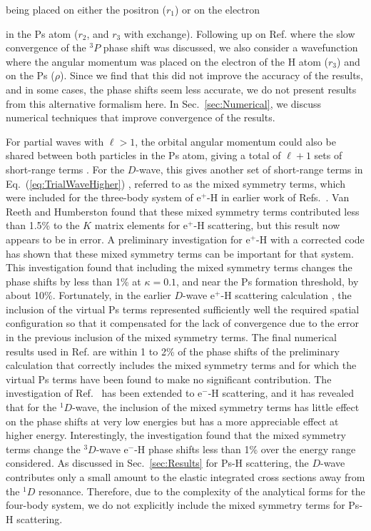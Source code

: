 \documentclass[preprint,showpacs,showkeys,preprintnumbers,amsmath,amssymb,longbibliography,pra,aps]{revtex4-1}
\begin{document}
being placed on either the positron ($r_1$) or on the electron {in the Ps
atom ($r_2$, and $r_3$
with exchange). Following up on Ref. \cite{VanReeth2004} where the slow 
convergence of the $^3P$ phase shift was discussed, we also consider a 
wavefunction where the angular momentum was placed on the electron of the H 
atom ($r_3$) and on the Ps ($\rho$). Since we find that this did not improve the
accuracy of the results, and in some cases, the phase shifts seem less
accurate, we do not present results from this alternative
formalism here.
In Sec.~\ref{sec:Numerical}, we discuss numerical techniques that improve
convergence of the results.

For partial waves with $\ell>1$, the orbital angular momentum could also be 
shared between both particles in the Ps atom, giving a total of
$\ell + 1$ sets of short-range terms \cite{Schwartz1961a}. For the
$D$-wave, this gives another set of short-range terms in
Eq.~(\ref{eq:TrialWaveHigher})
\cite{Humberston1997,VanReethThesis,BrownThesis}, referred to as the mixed
symmetry terms, which were included for the three-body system of e$^+$-H
in earlier work of
Refs.~\cite{Brown1985a,BrownThesis,WattsThesis,Humberston1997,VanReeth1997}.
Van Reeth and Humberston \cite{VanReeth1997} found that these
mixed symmetry terms contributed less than 1.5\% to the $K$ matrix elements
for e$^+$-H scattering, but this result now appears to be in error.
A preliminary investigation for e$^+$-H \cite{VanReeth2015} with a corrected
code has shown 
that these mixed symmetry terms can be important for that 
system. This investigation found that
including the mixed symmetry terms changes
the phase shifts by less than 1\% at $\kappa = 0.1$, and near the Ps formation
threshold, by about 10\%. Fortunately, in the earlier $D$-wave e$^+$-H
scattering
calculation \cite{Humberston1997}, the inclusion of the virtual Ps terms
represented sufficiently well the required spatial configuration so that it
compensated for the lack of convergence due to the
error in the previous inclusion of the mixed symmetry
terms. The final numerical results used in Ref. \cite{VanReeth1997} are
within 1 to 2\% of the phase shifts of the preliminary
calculation \cite{VanReeth2015} that correctly
includes the mixed symmetry terms and for which the virtual Ps terms have
been found to make no significant contribution. The investigation of
Ref.~\cite{VanReeth2015} has been extended to
e$^-$-H scattering, and it has revealed that
for the $^1D$-wave, the inclusion of the 
mixed symmetry terms has little effect on the phase shifts at very low
energies but has a more appreciable effect at higher energy. Interestingly,
the investigation found that the mixed symmetry terms change the
$^3D$-wave e$^-$-H phase shifts less than 1\% over the energy
range considered.
As discussed in Sec.~\ref{sec:Results} for Ps-H scattering, the $D$-wave
contributes only a small amount to the elastic integrated cross sections away 
from the $^1D$ resonance. Therefore, due to the complexity of the analytical 
forms for the four-body system, we do not explicitly include the mixed 
symmetry terms for Ps-H scattering.


}
\end{document}
